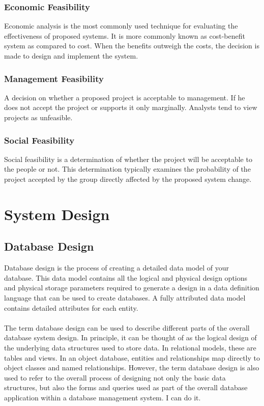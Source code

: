 \documentclass{article}
\begin{document}
\subsubsection{Economic Feasibility}
Economic analysis is the most commonly used technique for evaluating the effectiveness of proposed systems. It is more commonly known as cost-benefit system as compared to cost. When the benefits outweigh the costs, the decision is made to design and implement the system. 
\subsubsection{Management Feasibility}
A decision on whether a proposed project is acceptable to management. If he does not accept the project or supports it only marginally. Analysts tend to view projects as unfeasible.
\subsubsection{Social Feasibility}
Social feasibility is a determination of whether the project will be acceptable to the people or not. This determination typically examines the probability of the project accepted by the group directly affected by the proposed system change. 
\newpage
\section{System Design }
\subsection{Database Design }
Database design is the process of creating a detailed data model of your database. This data model contains all the logical and physical design options and physical storage parameters required to generate a design in a data definition language that can be used to create databases. A fully attributed data model contains detailed attributes for each entity.\\\\
The term database design can be used to describe different parts of the overall database system design. In principle, it can be thought of as the logical design of the underlying data structures used to store data. In relational models, these are tables and views. In an object database, entities and relationships map directly to object classes and named relationships. However, the term database design is also used to refer to the overall process of designing not only the basic data structures, but also the forms and queries used as part of the overall database application within a database management system. I can do it. 
\newpage
\end{document}
